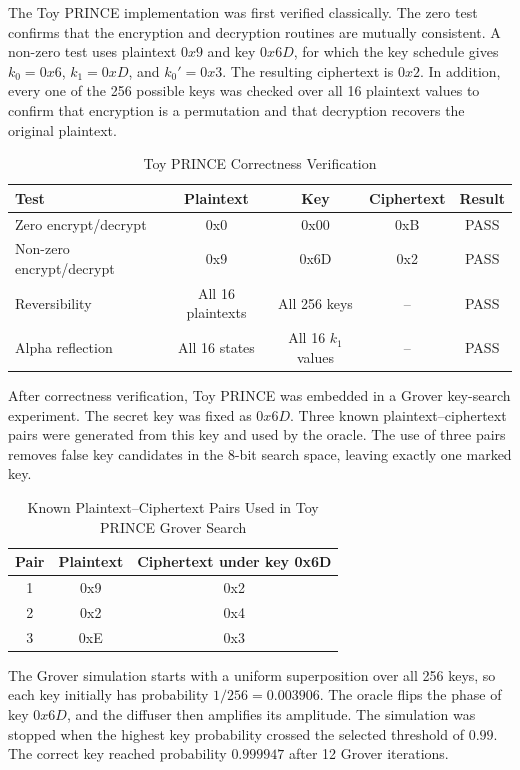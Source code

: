 \documentclass[11pt,a4paper]{article}
\begin{document}
The Toy PRINCE implementation was first verified classically. The zero test confirms that the encryption and decryption routines are mutually consistent. A non-zero test uses plaintext $0x9$ and key $0x6D$, for which the key schedule gives $k_0=0x6$, $k_1=0xD$, and $k_0'=0x3$. The resulting ciphertext is $0x2$. In addition, every one of the 256 possible keys was checked over all 16 plaintext values to confirm that encryption is a permutation and that decryption recovers the original plaintext.

\begin{table}[H]
\centering
\caption{Toy PRINCE Correctness Verification}
\label{tab:toy_prince_correctness}
\small
\begin{tabularx}{\textwidth}{|X|c|c|c|c|}
\hline
\textbf{Test} & \textbf{Plaintext} & \textbf{Key} & \textbf{Ciphertext} & \textbf{Result} \\
\hline
Zero encrypt/decrypt & 0x0 & 0x00 & 0xB & PASS \\
\hline
Non-zero encrypt/decrypt & 0x9 & 0x6D & 0x2 & PASS \\
\hline
Reversibility & All 16 plaintexts & All 256 keys & -- & PASS \\
\hline
Alpha reflection & All 16 states & All 16 $k_1$ values & -- & PASS \\
\hline
\end{tabularx}
\end{table}

After correctness verification, Toy PRINCE was embedded in a Grover key-search experiment. The secret key was fixed as $0x6D$. Three known plaintext--ciphertext pairs were generated from this key and used by the oracle. The use of three pairs removes false key candidates in the 8-bit search space, leaving exactly one marked key.

\begin{table}[H]
\centering
\caption{Known Plaintext--Ciphertext Pairs Used in Toy PRINCE Grover Search}
\label{tab:toy_prince_known_pairs}
\begin{tabular}{|c|c|c|}
\hline
\textbf{Pair} & \textbf{Plaintext} & \textbf{Ciphertext under key 0x6D} \\
\hline
1 & 0x9 & 0x2 \\
\hline
2 & 0x2 & 0x4 \\
\hline
3 & 0xE & 0x3 \\
\hline
\end{tabular}
\end{table}

The Grover simulation starts with a uniform superposition over all 256 keys, so each key initially has probability $1/256 = 0.003906$. The oracle flips the phase of key $0x6D$, and the diffuser then amplifies its amplitude. The simulation was stopped when the highest key probability crossed the selected threshold of $0.99$. The correct key reached probability $0.999947$ after 12 Grover iterations.
\end{document}
